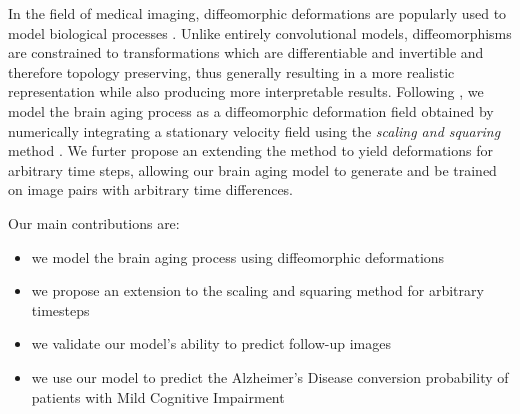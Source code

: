 In the field of medical imaging, diffeomorphic deformations are popularly used to model biological processes \cite{beg2005computing} \cite{ashburner2007fast}. Unlike entirely convolutional models, diffeomorphisms are constrained to transformations which are differentiable and invertible and therefore topology preserving, thus generally resulting in a more realistic representation while also producing more interpretable results. Following \cite{dalca2018unsupervised}, we model the brain aging process as a diffeomorphic deformation field obtained by numerically integrating a stationary velocity field using the \textit{scaling and squaring} method \cite{arsigny2006log}. We furter propose an extending the method to yield deformations for arbitrary time steps, allowing our brain aging model to generate and be trained on image pairs with arbitrary time differences. 

Our main contributions are:

\begin{itemize}
	\item we model the brain aging process using diffeomorphic deformations%
	\item we propose an extension to the scaling and squaring method for arbitrary timesteps
	\item we validate our model's ability to predict follow-up images
	\item we use our model to predict the Alzheimer's Disease conversion probability of patients with Mild Cognitive Impairment
\end{itemize}
